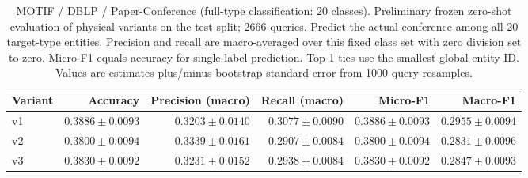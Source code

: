 \begin{table}[htbp]
\centering
\small
\begin{adjustbox}{max width=\linewidth}
\begin{tabular}{lrrrrr}
\toprule
Variant & Accuracy & Precision (macro) & Recall (macro) & Micro-F1 & Macro-F1 \\
\midrule
v1 & $0.3886 \pm 0.0093$ & $0.3203 \pm 0.0140$ & $0.3077 \pm 0.0090$ & $0.3886 \pm 0.0093$ & $0.2955 \pm 0.0094$ \\
v2 & $0.3800 \pm 0.0094$ & $0.3339 \pm 0.0161$ & $0.2907 \pm 0.0084$ & $0.3800 \pm 0.0094$ & $0.2831 \pm 0.0096$ \\
v3 & $0.3830 \pm 0.0092$ & $0.3231 \pm 0.0152$ & $0.2938 \pm 0.0084$ & $0.3830 \pm 0.0092$ & $0.2847 \pm 0.0093$ \\
\bottomrule
\end{tabular}
\end{adjustbox}
\caption{MOTIF / DBLP / Paper-Conference (full-type classification: 20 classes). Preliminary frozen zero-shot evaluation of physical variants on the test split; 2666 queries. Predict the actual conference among all 20 target-type entities. Precision and recall are macro-averaged over this fixed class set with zero division set to zero. Micro-F1 equals accuracy for single-label prediction. Top-1 ties use the smallest global entity ID. Values are estimates plus/minus bootstrap standard error from 1000 query resamples.}
\label{tab:motif-dblp-paper-conference-classification}
\end{table}
